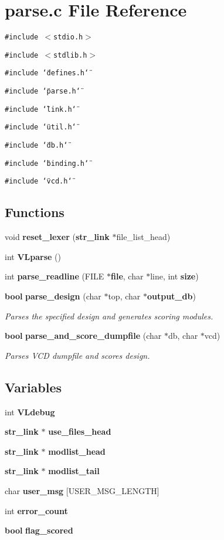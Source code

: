 \section{parse.c File Reference}
\label{parse_8c}
{\tt \#include $<$stdio.h$>$}\par
{\tt \#include $<$stdlib.h$>$}\par
{\tt \#include \char`\"{}defines.h\char`\"{}}\par
{\tt \#include \char`\"{}parse.h\char`\"{}}\par
{\tt \#include \char`\"{}link.h\char`\"{}}\par
{\tt \#include \char`\"{}util.h\char`\"{}}\par
{\tt \#include \char`\"{}db.h\char`\"{}}\par
{\tt \#include \char`\"{}binding.h\char`\"{}}\par
{\tt \#include \char`\"{}vcd.h\char`\"{}}\par
\subsection*{Functions}
\begin{CompactItemize}
\item 
void {\bf reset\_\-lexer} ({\bf str\_\-link} $\ast$file\_\-list\_\-head)
\item 
int {\bf VLparse} ()
\item 
int {\bf parse\_\-readline} (FILE $\ast${\bf file}, char $\ast$line, int {\bf size})
\item 
{\bf bool} {\bf parse\_\-design} (char $\ast$top, char $\ast${\bf output\_\-db})
\begin{CompactList}\small\item\em Parses the specified design and generates scoring modules. \item\end{CompactList}\item 
{\bf bool} {\bf parse\_\-and\_\-score\_\-dumpfile} (char $\ast$db, char $\ast$vcd)
\begin{CompactList}\small\item\em Parses VCD dumpfile and scores design. \item\end{CompactList}\end{CompactItemize}
\subsection*{Variables}
\begin{CompactItemize}
\item 
int {\bf VLdebug}
\item 
{\bf str\_\-link} $\ast$ {\bf use\_\-files\_\-head}
\item 
{\bf str\_\-link} $\ast$ {\bf modlist\_\-head}
\item 
{\bf str\_\-link} $\ast$ {\bf modlist\_\-tail}
\item 
char {\bf user\_\-msg} [USER\_\-MSG\_\-LENGTH]
\item 
int {\bf error\_\-count}
\item 
{\bf bool} {\bf flag\_\-scored}
\end{CompactItemize}


